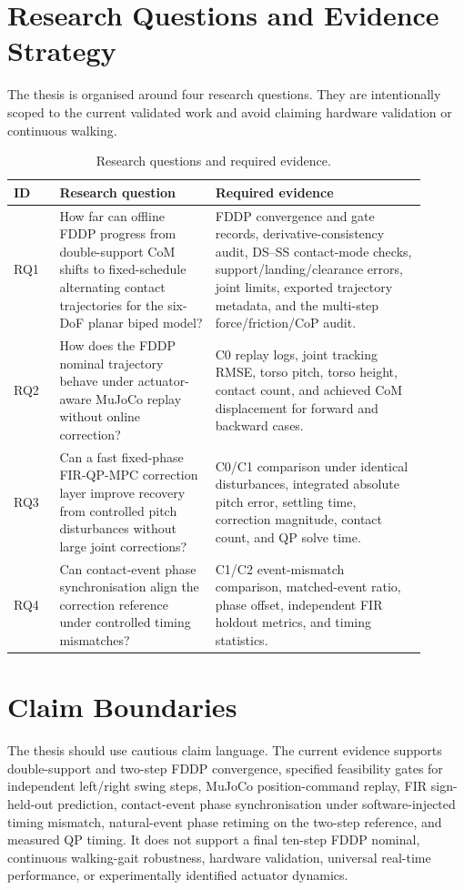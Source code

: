 \documentclass[12pt,a4paper]{report}
\begin{document}
\section{Research Questions and Evidence Strategy}
The thesis is organised around four research questions. They are intentionally scoped to the current validated work and avoid claiming hardware validation or continuous walking.
 
\begin{table}[htbp]
\centering
\caption{Research questions and required evidence.}
\label{tab:research_questions}
\begin{tabular}{@{}p{0.10\linewidth}p{0.34\linewidth}p{0.46\linewidth}@{}}
\toprule
ID & Research question & Required evidence \\
\midrule
RQ1 & How far can offline FDDP progress from double-support CoM shifts to fixed-schedule alternating contact trajectories for the six-DoF planar biped model? & FDDP convergence and gate records, derivative-consistency audit, DS--SS contact-mode checks, support/landing/clearance errors, joint limits, exported trajectory metadata, and the multi-step force/friction/CoP audit. \\
RQ2 & How does the FDDP nominal trajectory behave under actuator-aware MuJoCo replay without online correction? & C0 replay logs, joint tracking RMSE, torso pitch, torso height, contact count, and achieved CoM displacement for forward and backward cases. \\
RQ3 & Can a fast fixed-phase FIR-QP-MPC correction layer improve recovery from controlled pitch disturbances without large joint corrections? & C0/C1 comparison under identical disturbances, integrated absolute pitch error, settling time, correction magnitude, contact count, and QP solve time. \\
RQ4 & Can contact-event phase synchronisation align the correction reference under controlled timing mismatches? & C1/C2 event-mismatch comparison, matched-event ratio, phase offset, independent FIR holdout metrics, and timing statistics. \\
\bottomrule
\end{tabular}
\end{table}
 
\section{Claim Boundaries}
The thesis should use cautious claim language. The current evidence supports double-support and two-step FDDP convergence, specified feasibility gates for independent left/right swing steps, MuJoCo position-command replay, FIR sign-held-out prediction, contact-event phase synchronisation under software-injected timing mismatch, natural-event phase retiming on the two-step reference, and measured QP timing. It does not support a final ten-step FDDP nominal, continuous walking-gait robustness, hardware validation, universal real-time performance, or experimentally identified actuator dynamics.
 
\end{document}
